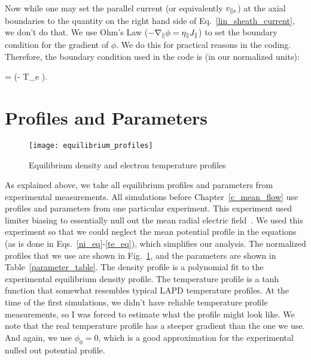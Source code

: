 Now while one may set the parallel current (or equivalently $v_{\parallel e}$) at the axial boundaries to the quantity on the right hand side of Eq.~\ref{lin_sheath_current}, we don't do that.
We use Ohm's Law ($- \nabla_\parallel \phi = \eta_\parallel J_\parallel$) to set the boundary condition for the gradient of $\phi$. We do this for practical reasons in the coding. Therefore, the
boundary condition used in the code is (in our normalized units):

\beq
\label{sheath_bc}
\gradpar \phi = \pm {} \left(\phi - \Lambda T_e  \right).
\eeq



\section{Profiles and Parameters}
\label{s_profs_params}

\begin{figure}[!htbp]
\texttt{[image: equilibrium\_profiles]}
\hfil
\caption{Equilibrium density and electron temperature profiles}
\label{equilibrium_profiles}
\end{figure}


As explained above, we take all equilibrium profiles and parameters from experimental measurements. 
All simulations before Chapter~\ref{c_mean_flow} use profiles and parameters from one particular experiment.
This experiment used limiter biasing to essentially null out the mean radial electric field~\cite{schaffner2012}. We used this experiment so that we could neglect the mean potential profile
in the equations (as is done in Eqs.~\ref{ni_eq}-\ref{te_eq}), which simplifies our analysis. The normalized profiles that we use are shown in Fig.~\ref{equilibrium_profiles}, and the parameters
are shown in Table~\ref{parameter_table}. The density profile is
a polynomial fit to the experimental equilibrium density profile. The temperature profile is a tanh function that somewhat resembles typical LAPD temperature profiles. At the time of the first
simulations, we didn't have reliable temperature profile measurements, so I was forced to estimate what the profile might look like. We note that the real temperature profile has a steeper
gradient than the one we use. And again, we use $\phi_0 = 0$, which is a good approximation for the experimental nulled out potential profile.

